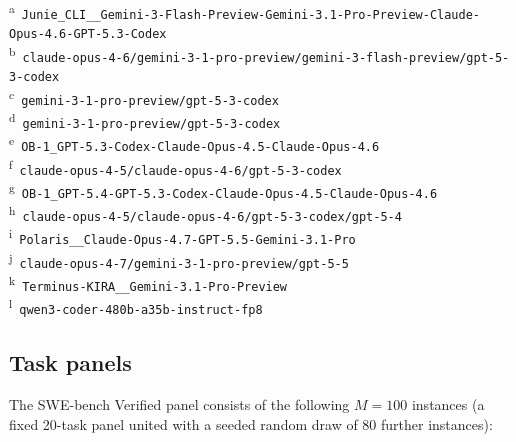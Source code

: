 {\scriptsize\noindent \textsuperscript{a}~\texttt{Junie\_CLI\_\_Gemini-3-Flash-Preview-Gemini-3.1-Pro-Preview-Claude-Opus-4.6-GPT-5.3-Codex} \\
\textsuperscript{b}~\texttt{claude-opus-4-6/gemini-3-1-pro-preview/gemini-3-flash-preview/gpt-5-3-codex} \\
\textsuperscript{c}~\texttt{gemini-3-1-pro-preview/gpt-5-3-codex} \\
\textsuperscript{d}~\texttt{gemini-3-1-pro-preview/gpt-5-3-codex} \\
\textsuperscript{e}~\texttt{OB-1\_GPT-5.3-Codex-Claude-Opus-4.5-Claude-Opus-4.6} \\
\textsuperscript{f}~\texttt{claude-opus-4-5/claude-opus-4-6/gpt-5-3-codex} \\
\textsuperscript{g}~\texttt{OB-1\_GPT-5.4-GPT-5.3-Codex-Claude-Opus-4.5-Claude-Opus-4.6} \\
\textsuperscript{h}~\texttt{claude-opus-4-5/claude-opus-4-6/gpt-5-3-codex/gpt-5-4} \\
\textsuperscript{i}~\texttt{Polaris\_\_Claude-Opus-4.7-GPT-5.5-Gemini-3.1-Pro} \\
\textsuperscript{j}~\texttt{claude-opus-4-7/gemini-3-1-pro-preview/gpt-5-5} \\
\textsuperscript{k}~\texttt{Terminus-KIRA\_\_Gemini-3.1-Pro-Preview} \\
\textsuperscript{l}~\texttt{qwen3-coder-480b-a35b-instruct-fp8}}

\subsection{Task panels}
The SWE-bench Verified panel consists of the following $M = 100$ instances (a fixed 20-task panel united with a seeded random draw of 80 further instances):

